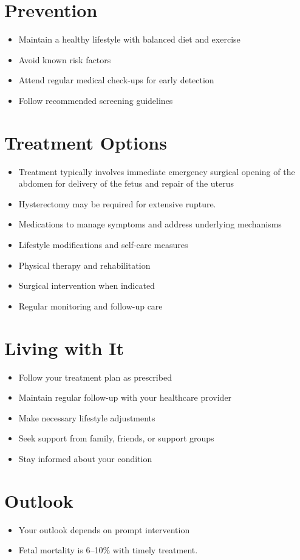 \section{Prevention}
\begin{itemize}[noitemsep]
  \item Maintain a healthy lifestyle with balanced diet and exercise
  \item Avoid known risk factors
  \item Attend regular medical check-ups for early detection
  \item Follow recommended screening guidelines
\end{itemize}
\section{Treatment Options}
\begin{itemize}[noitemsep]
  \item Treatment typically involves immediate emergency surgical opening of the abdomen for delivery of the fetus and repair of the uterus
  \item Hysterectomy may be required for extensive rupture.
  \item Medications to manage symptoms and address underlying mechanisms
  \item Lifestyle modifications and self-care measures
  \item Physical therapy and rehabilitation
  \item Surgical intervention when indicated
  \item Regular monitoring and follow-up care
\end{itemize}
\section{Living with It}
\begin{itemize}[noitemsep]
  \item Follow your treatment plan as prescribed
  \item Maintain regular follow-up with your healthcare provider
  \item Make necessary lifestyle adjustments
  \item Seek support from family, friends, or support groups
  \item Stay informed about your condition
\end{itemize}
\section{Outlook}
\begin{itemize}[noitemsep]
  \item Your outlook depends on prompt intervention
  \item Fetal mortality is 6--10\% with timely treatment.
\end{itemize}
